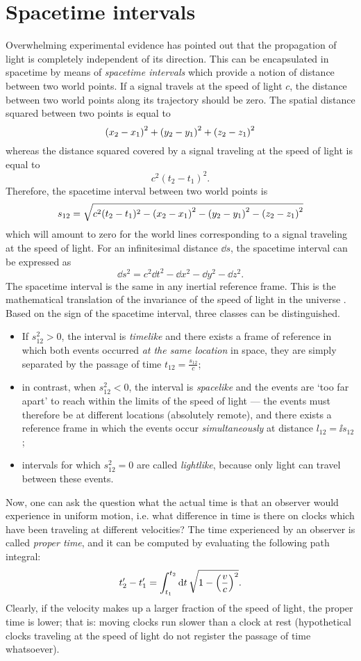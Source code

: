 \section{Spacetime intervals}
Overwhelming experimental evidence has pointed out that the propagation of light is completely independent of its direction. This can be encapsulated in spacetime by means of \emph{spacetime intervals} which provide a notion of distance between two world points. If a signal travels at the speed of light \(c\), the distance between two world points along its trajectory should be zero. The spatial distance squared between two points is equal to
\[ \qty(x_2 - x_1)^2 + \qty(y_2 - y_1)^2 + \qty(z_2 - z_1)^2 \]
whereas the distance squared covered by a signal traveling at the speed of light is equal to 
\[c^2(t_2 - t_1)^2. \]
Therefore, the spacetime interval between two world points is
\[
    s_{12} = \sqrt{c^2(t_2 - t_1)^2 - \qty(x_2 - x_1)^2 - \qty(y_2 - y_1)^2 - \qty(z_2 - z_1)^2}
\]
which will amount to zero for the world lines corresponding to a signal traveling at the speed of light. For an infinitesimal distance \(\dd{s}\), the spacetime interval can be expressed as
\[ \dd{s}^2 = c^2 \dd{t}^2 - \dd{x}^2 - \dd{y}^2 - \dd{z}^2.\]
The spacetime interval is the same in any inertial reference frame. This is the mathematical translation of the invariance of the speed of light in the universe \cite{Landau1971}. Based on the sign of the spacetime interval, three classes can be distinguished.
\begin{itemize}
    \item If \(s_{12}^2 > 0\), the interval is \emph{timelike} and there exists a frame of reference in which both events occurred \emph{at the same location} in space, they are simply separated by the passage of time \(t_{12} = \frac{s_{12}}{c}\); 
    \item in contrast, when \(s_{12}^2 < 0\), the interval is \emph{spacelike} and the events are `too far apart' to reach within the limits of the speed of light --- the events must therefore be at different locations (absolutely remote), and there exists a reference frame in which the events occur \emph{simultaneously} at distance \(l_{12} = \ii s_{12}\);
    \item intervals for which \(s_{12}^2 = 0\) are called \emph{lightlike}, because only light can travel between these events.
\end{itemize}
Now, one can ask the question what the actual time is that an observer would experience in uniform motion, i.e. what difference in time is there on clocks which have been traveling at different velocities? The time experienced by an observer is called \emph{proper time}, and it can be computed by evaluating the following path integral:
\begin{equation}
    t'_2 - t'_1 = \int^{t_2}_{t_1} \dd{t} \sqrt{1 - \qty(\frac{v}{c})^2}.
    \label{eq:proper_time}
\end{equation}
Clearly, if the velocity makes up a larger fraction of the speed of light, the proper time is lower; that is: moving clocks run slower than a clock at rest (hypothetical clocks traveling at the speed of light do not register the passage of time whatsoever).

